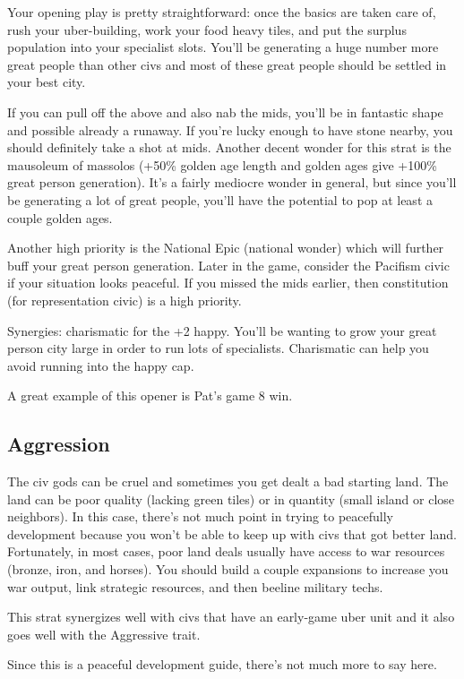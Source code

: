 \documentclass[10pt]{article}
\begin{document}
Your opening play is pretty straightforward: once the basics are taken
care of, rush your uber-building, work your food heavy tiles, and put
the surplus population into your specialist slots. You'll be
generating a huge number more great people than other civs and most of
these great people should be settled in your best city.

If you can pull off the above and also nab the mids, you'll be in
fantastic shape and possible already a runaway. If you're lucky enough
to have stone nearby, you should definitely take a shot at
mids. Another decent wonder for this strat is the mausoleum of massolos
(+50\% golden age length and golden ages give +100\% great person
generation). It's a fairly mediocre wonder in general, but since
you'll be generating a lot of great people, you'll have the potential
to pop at least a couple golden ages.

Another high priority is the National Epic (national wonder) which
will further buff your great person generation. Later in the game,
consider the Pacifism civic if your situation looks peaceful. If you
missed the mids earlier, then constitution (for representation civic)
is a high priority.

Synergies: charismatic for the +2 happy. You'll be wanting to grow
your great person city large in order to run lots of
specialists. Charismatic can help you avoid running into the happy
cap.

A great example of this opener is Pat's game 8 win.

\subsection*{Aggression}

The civ gods can be cruel and sometimes you get dealt a bad starting
land. The land can be poor quality (lacking green tiles) or in
quantity (small island or close neighbors). In this case, there's not
much point in trying to peacefully development because you won't be
able to keep up with civs that got better land. Fortunately, in most
cases, poor land deals usually have access to war resources (bronze,
iron, and horses). You should build a couple expansions to increase
you war output, link strategic resources, and then beeline military
techs.

This strat synergizes well with civs that have an early-game uber unit
and it also goes well with the Aggressive trait.

Since this is a peaceful development guide, there's not much more to say here.
\end{document}
